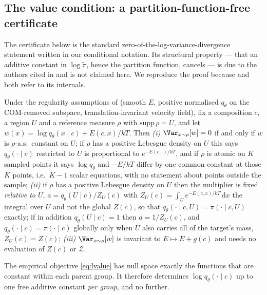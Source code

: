\subsection{The value condition: a partition-function-free certificate}
\label{app:certificate}

The certificate below is the standard zero-of-the-log-variance-divergence
statement written in our conditional notation. Its structural property --- that an
additive constant in $\log\tilde\pi$, hence the partition function, cancels --- is
due to the authors cited in  and is not claimed here. We reproduce
the proof because  and  both refer to its internals.

\begin{theorem}
\label{thm:certificate}
Under the regularity assumptions of  (smooth $E$, positive normalised
$q_\theta$ on the COM-removed subspace, translation-invariant velocity field), fix a composition
$c$, a region $U$ and a reference measure $\rho$ with $\mathrm{supp}\,\rho = U$, and let
$w(x) = \log q_\theta(x \mid c) + E(c,x)/kT$. Then \emph{(i)} $\Var_{x\sim\rho}[w] = 0$ if and
only if $w$ is $\rho$-a.s.\ constant on $U$; if $\rho$ has a positive Lebesgue density on $U$ this
says $q_\theta(\cdot \mid c)$ restricted to $U$ is proportional to $e^{-E(c,\cdot)/kT}$, and if
$\rho$ is atomic on $K$ sampled points it says $\log q_\theta$ and $-E/kT$ differ by one common
constant at those $K$ points, i.e.\ $K-1$ scalar equations, with no statement about points outside
the sample; \emph{(ii)} if $\rho$ has a positive Lebesgue density on $U$ then the multiplier is
fixed \emph{relative to $U$}, $a = q_\theta(U \mid c)/Z_U(c)$ with
$Z_U(c) = \int_U e^{-E(c,x)/kT}\,\mathrm{d}x$ the integral over $U$ and not the global $Z(c)$, so
that $q_\theta(\cdot \mid c, U) = \pi(\cdot \mid c, U)$ exactly; if in addition
$q_\theta(U \mid c) = 1$ then $a = 1/Z_U(c)$, and $q_\theta(\cdot \mid c) = \pi(\cdot \mid c)$
globally only when $U$ also carries all of the target's mass, $Z_U(c) = Z(c)$;
\emph{(iii)} $\Var_{x\sim\rho}[w]$ is
invariant to $E \mapsto E + g(c)$ and needs no evaluation of $Z(c)$ or $\mathcal{Z}$.
\end{theorem}

\begin{corollary}
\label{cor:gauge}
The empirical objective \eqref{eq:lvalue} has null space exactly the functions that are
constant within each parent group. It therefore determines $\log q_\theta(\cdot \mid c)$ up to
one free additive constant \emph{per group}, and no further.
\end{corollary}

